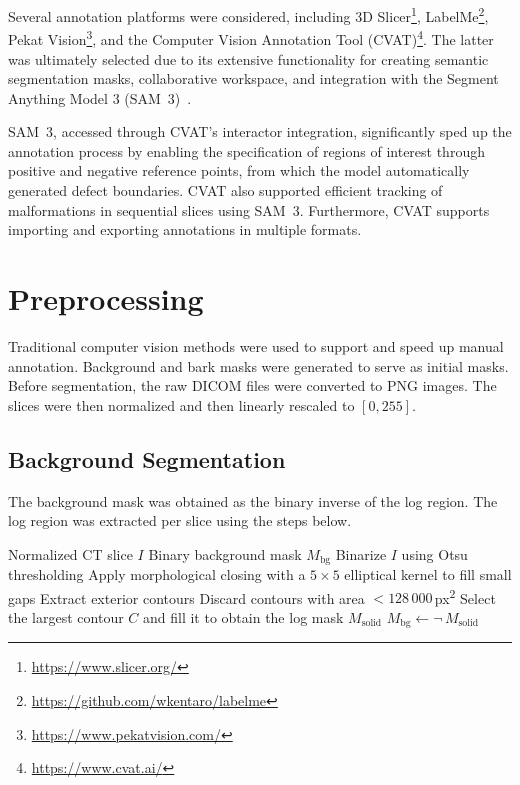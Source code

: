 Several annotation platforms were considered, including 3D Slicer\footnote{\url{https://www.slicer.org/}}, LabelMe\footnote{\url{https://github.com/wkentaro/labelme}}, Pekat Vision\footnote{\url{https://www.pekatvision.com/}}, and the Computer Vision Annotation Tool (CVAT)\footnote{\url{https://www.cvat.ai/}}. The latter was ultimately selected due to its extensive functionality for creating semantic segmentation masks, collaborative workspace, and integration with the Segment Anything Model 3 (SAM~3)~\cite{sam3}.

SAM~3, accessed through CVAT's interactor integration, significantly sped up the annotation process by enabling the specification of regions of interest through positive and negative reference points, from which the model automatically generated defect boundaries. CVAT also supported efficient tracking of malformations in sequential slices using SAM~3. Furthermore, CVAT supports importing and exporting annotations in multiple formats.


\section{Preprocessing}

Traditional computer vision methods were used to support and speed up manual annotation.
Background and bark masks were generated to serve as initial masks.
Before segmentation, the raw DICOM files were converted to PNG images. The slices were then normalized and then linearly rescaled to $[0, 255]$.


\subsection{Background Segmentation}

The background mask was obtained as the binary inverse of the log region.
The log region was extracted per slice using the steps below.

\begin{algorithm}[H]
\caption{Log mask and background extraction per CT slice}
\label{alg:logmask}
\begin{algorithmic}[1]
\Require Normalized CT slice $I$
\Ensure Binary background mask $M_\text{bg}$
\State Binarize $I$ using Otsu thresholding
\State Apply morphological closing with a $5 \times 5$ elliptical kernel to fill small gaps
\State Extract exterior contours 
\State Discard contours with area $< 128\,000$\,px\textsuperscript{2}
\State Select the largest contour $C$ and fill it to obtain the log mask $M_\text{solid}$
\State $M_\text{bg} \gets \neg\,M_\text{solid}$
\end{algorithmic}
\end{algorithm}

